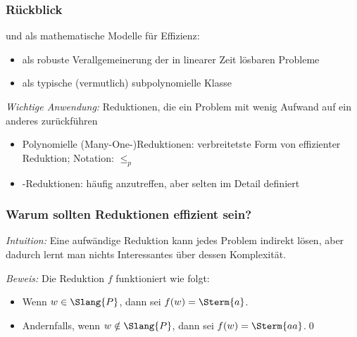 \documentclass[aspectratio=1610,onlymath]{beamer}
\begin{document}
\maketitle

\begin{frame}\frametitle{Rückblick}

 und  als mathematische Modelle für Effizienz:
\begin{itemize}
\item {} als robuste Verallgemeinerung der in linearer Zeit lösbaren Probleme
\item {} als typische (vermutlich) subpolynomielle Klasse
\end{itemize}\bigskip

\emph{Wichtige Anwendung:} Reduktionen, die ein Problem mit wenig Aufwand auf ein anderes zurückführen
\begin{itemize}
\item \alert{Polynomielle (Many-One-)Reduktionen:} verbreitetste Form von effizienter Reduktion; Notation: $\leq_p$
\item \alert{-Reduktionen:} häufig anzutreffen, aber selten im Detail definiert
\end{itemize}

\end{frame}

\begin{frame}\frametitle{Warum sollten Reduktionen effizient sein?}

\emph{Intuition:} Eine aufwändige Reduktion kann jedes Problem indirekt lösen, aber dadurch lernt man nichts
Interessantes über dessen Komplexität.\pause
\bigskip

\pause

\emph{Beweis:} Die Reduktion $f$ funktioniert wie folgt:
\begin{itemize}
\item Wenn $w\in \Slang{P}$, dann sei $f(w)=\Sterm{a}$.
\item Andernfalls, wenn $w\notin \Slang{P}$, dann sei $f(w)=\Sterm{aa}$.\qed
\end{itemize}

\end{frame}
\end{document}
